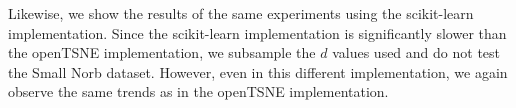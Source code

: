 \documentclass[12pt]{opt2019} %
\begin{document}

Likewise, we show the results of the same experiments using the scikit-learn implementation. Since the scikit-learn implementation is significantly slower than the openTSNE implementation, we subsample the $d$ values used and do not test the Small Norb dataset. However, even in this different implementation, we again observe the same trends as in the openTSNE implementation. 
\end{document}
